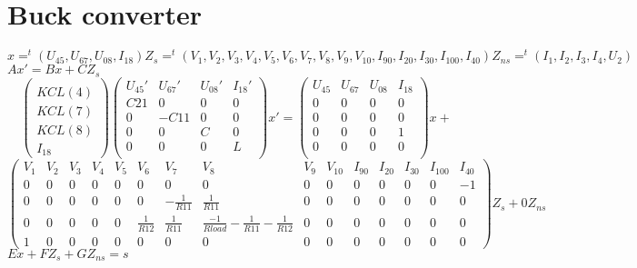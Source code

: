 \documentclass[10pt]{article}
\begin{document}
\section{Buck converter}
\begin{figure}[h]
\centerline{
 \scalebox{1.0}{
    
 }
}\end{figure}
$x=^{t}(U_{45},U_{67},U_{08},I_{18}) Z_{s}=^{t}(V_{1},V_{2},V_{3},V_{4},V_{5},V_{6},V_{7},V_{8},V_{9},V_{10},I_{90},I_{20},I_{30},I_{100},I_{40})
Z_{ns}=^{t}(I_{1},I_{2},I_{3},I_{4},U_{2})$\\
\underline{$Ax'= Bx+CZ_{s}$}
\[\left(\begin{array}{c}
  \\
KCL(4)\\KCL(7)\\KCL(8)\\I_{18}
\end{array}\right)
\left(\begin{array}{cccc}
  U_{45}'&U_{67}'&U_{08}'&I_{18}'\\
  \hline
  C21&0&0&0\\
  0&-C11&0&0\\
  0&0&C&0\\
  0&0&0&L\\  
\end{array}\right)x'=
\left(\begin{array}{cccc}
  U_{45}&U_{67}&U_{08}&I_{18}\\
  \hline
  0&0&0&0\\
  0&0&0&0\\
  0&0&0&1\\
  0&0&0&0\\
\end{array}\right)x+\]
\[
\left(\begin{array}{ccccccccccccccc}
  V_{1}&V_{2}&V_{3}&V_{4}&V_{5}&V_{6}&V_{7}&V_{8}&V_{9}&V_{10}&I_{90}&I_{20}&I_{30}&I_{100}&I_{40}\\
  \hline
  0&0&0&0&0&0&0&0&0&0&0&0&0&0&-1\\
  0&0&0&0&0&0&-\frac{1}{R11}&\frac{1}{R11}&0&0&0&0&0&0&0\\
  0&0&0&0&0&\frac{1}{R12}&\frac{1}{R11}&\frac{-1}{Rload}-\frac{1}{R11}-\frac{1}{R12}&0&0&0&0&0&0&0\\
  1&0&0&0&0&0&0&0&0&0&0&0&0&0&0
\end{array}\right)Z_{s}+0Z_{ns}\]
\underline{$Ex+FZ_{s}+GZ_{ns}=s$}
\end{document}
